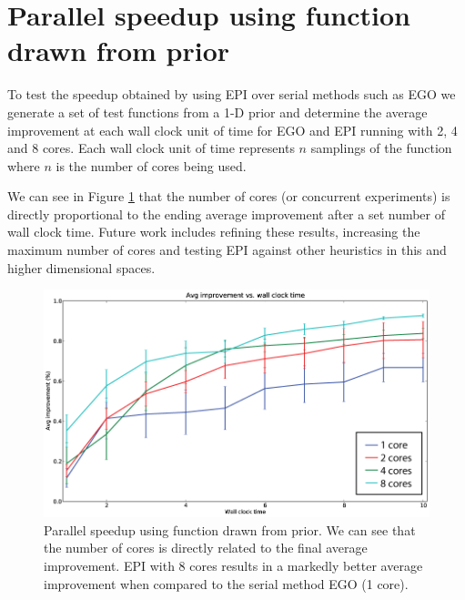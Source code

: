 \documentclass[phd,tocprelim]{cornell}
\begin{document}
\section{Parallel speedup using function drawn from prior}

To test the speedup obtained by using EPI over serial methods such as EGO we generate a set of test functions from a 1-D prior and determine the average improvement at each wall clock unit of time for EGO and EPI running with 2, 4 and 8 cores. Each wall clock unit of time represents $n$ samplings of the function where $n$ is the number of cores being used.

We can see in Figure \ref{fig:EPI_res1} that the number of cores (or concurrent experiments) is directly proportional to the ending average improvement after a set number of wall clock time. Future work includes refining these results, increasing the maximum number of cores and testing EPI against other heuristics in this and higher dimensional spaces.

\begin{figure}[hpt]
 	\centerline{\includegraphics[width=\textwidth]{figures/EPI/speedup_vs_wallclock_8_core_9_its.png}}
    \caption[Parallel speedup for function drawn from prior]{Parallel speedup using function drawn from prior. We can see that the number of cores is directly related to the final average improvement. EPI with 8 cores results in a markedly better average improvement when compared to the serial method EGO (1 core).}
 	\label{fig:EPI_res1}
\end{figure}


\end{document}
